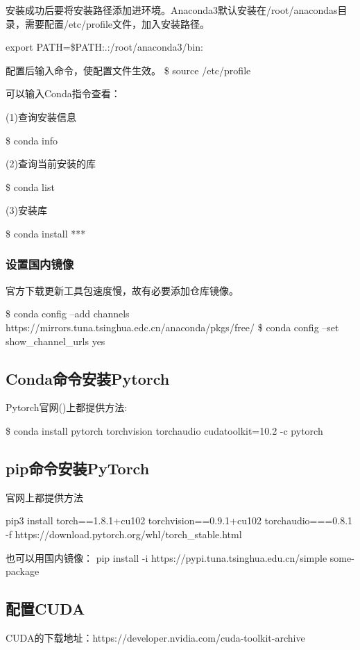 \documentclass[openbib]{article}
\begin{document}
	安装成功后要将安装路径添加进环境。Anaconda3默认安装在/root/anacondas目录，需要配置/etc/profile文件，加入安装路径。
	
	export PATH=\$PATH:.:/root/anaconda3/bin:
	
	配置后输入命令，使配置文件生效。
	\$ source /etc/profile
	
	可以输入Conda指令查看：
	
	(1)查询安装信息
	
	\$ conda info
	
	(2)查询当前安装的库
	
	\$ conda list
	
	(3)安装库
	
	\$ conda install ***
	
	\subsubsection{设置国内镜像}
	
	官方下载更新工具包速度慢，故有必要添加仓库镜像。
	
	\$ conda config --add channels
	https://mirrors.tuna.tsinghua.edc.cn/anaconda/pkgs/free/ \$ conda config --set show\_channel\_urls yes
	
	\subsection{Conda命令安装Pytorch}

	Pytorch官网()上都提供方法:
	
	\$ conda install pytorch torchvision torchaudio cudatoolkit=10.2 -c pytorch

	\subsection{pip命令安装PyTorch}
	
	官网上都提供方法
	
	pip3 install torch==1.8.1+cu102 torchvision==0.9.1+cu102 torchaudio===0.8.1 -f https://download.pytorch.org/whl/torch\_stable.html
	
	也可以用国内镜像：
	pip install -i https://pypi.tuna.tsinghua.edu.cn/simple some-package
	
	\subsection{配置CUDA}
	
	CUDA的下载地址：https://developer.nvidia.com/cuda-toolkit-archive
	
\end{document}
